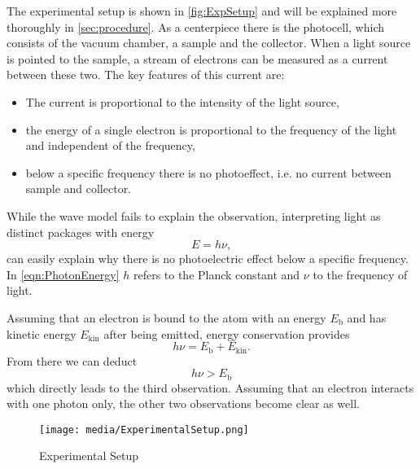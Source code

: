 The experimental setup is shown in \autoref{fig:ExpSetup} and will be explained more thoroughly in
\autoref{sec:procedure}. As a centerpiece there is the photocell, which consists of the vacuum
chamber, a sample and the collector. When a light source is pointed to the sample, a stream of
electrons can be measured as a current between these two. The key features of this current are:
\begin{itemize}
  \item The current is proportional to the intensity of the light source,
  \item the energy of a single electron is proportional to the frequency of the light and
    independent of the frequency,
  \item below a specific frequency there is no photoeffect, i.e. no current between sample and
    collector.
\end{itemize}
While the wave model fails to explain the  observation, interpreting light as distinct
packages with energy
\begin{equation}
  E = h\nu,
  \label{eqn:PhotonEnergy}
\end{equation}
can easily explain why there is no photoelectric effect below a specific frequency.
In \autoref{eqn:PhotonEnergy} $h$ refers to the Planck constant and $\nu$ to the frequency of
light.

Assuming that an electron is bound to the atom with an energy $E_\text{b}$ and has kinetic energy
$E_\text{kin}$ after being emitted, energy conservation provides
\begin{equation}
    h\nu = E_\text{b} + E_\text{kin}.
    \label{eqn:EnergyConservation}
\end{equation}
From there we can deduct 
\[
  h\nu > E_\text{b}
\]
which directly leads to the third observation. Assuming that an electron interacts with one photon
only, the other two observations become clear as well.

\begin{figure}
    \centering
    \texttt{[image: media/ExperimentalSetup.png]}
    \caption{Experimental Setup}
    \label{fig:ExpSetup}
\end{figure}

